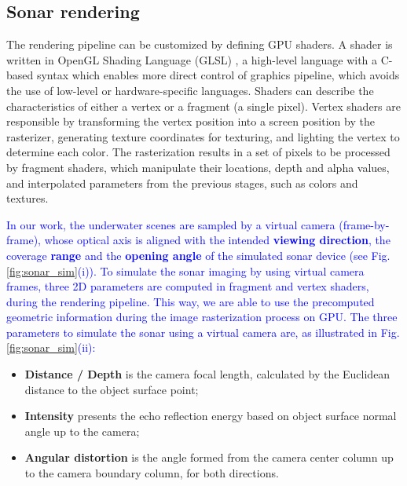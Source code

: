 \documentclass[final,5p,times]{elsarticle}
\begin{document}

\subsection{Sonar rendering}
\label{dev:shader}

The rendering pipeline can be customized by defining GPU shaders. A shader is written in OpenGL Shading Language (GLSL) \cite{rost2009}, a high-level language with a C-based syntax which enables more direct control of graphics pipeline, which avoids the use of low-level or hardware-specific languages. Shaders can describe the characteristics of either a vertex or a fragment (a single pixel). Vertex shaders are responsible by transforming the vertex position into a screen position by the rasterizer, generating texture coordinates for texturing, and lighting the vertex to determine each color. The rasterization results in a set of pixels to be processed by fragment shaders, which manipulate their locations, depth and alpha values, and interpolated parameters from the previous stages, such as colors and textures.

\textcolor{blue}{In our work, the underwater scenes are sampled by a virtual camera (frame-by-frame), whose
optical axis is aligned with the intended \textbf{viewing direction}, the coverage \textbf{range} and the \textbf{opening angle} of the simulated sonar device (see Fig. \ref{fig:sonar_sim}(i)). To simulate the sonar imaging by using virtual camera frames, three 2D parameters are computed in fragment and vertex shaders, during the rendering pipeline. This way, we are able to use the precomputed geometric information during the image rasterization process on GPU. The three parameters to simulate the sonar using a virtual camera are, as illustrated in Fig. \ref{fig:sonar_sim}(ii):}

\begin{itemize}[]
    \item \textbf{Distance / Depth} is the camera focal length, calculated by the
    Euclidean distance to the object surface point; %
    \item \textbf{Intensity} presents the echo reflection energy based
    on object surface normal angle up to the camera; %
    \item \textbf{Angular distortion} is the angle formed from the camera
    center column up to the camera boundary column, for both directions. %
\end{itemize}
\end{document}
